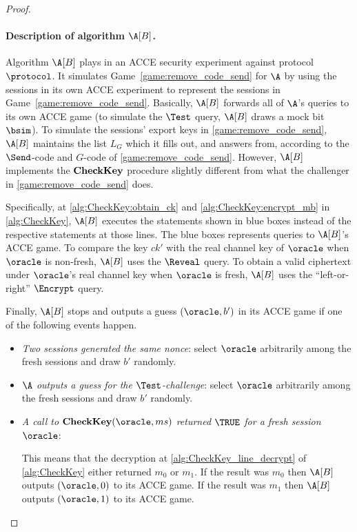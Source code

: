 \begin{proof}
\paragraph{Description of algorithm \texorpdfstring{$\A[B]$}{B}.}
Algorithm $\A[B]$ plays in an ACCE security experiment against protocol $\protocol$.
It simulates Game~\ref{game:remove_code_send} for $\A$ by using the sessions in its own ACCE experiment to represent the sessions in Game~\ref{game:remove_code_send}.
Basically,
$\A[B]$ forwards all of $\A$'s queries to its own ACCE game
(to simulate the $\Test$ query,
$\A[B]$ draws a mock bit $\bsim$).
To simulate the sessions' export keys in \cref{game:remove_code_send},
$\A[B]$ maintains the list $L_G$ which it fills out,
and answers from, 
according to the $\Send$-code and $G$-code of \cref{game:remove_code_send}.
However,
$\A[B]$ implements the $\mathbf{CheckKey}$ procedure slightly different from what the challenger in \cref{game:remove_code_send} does. 

Specifically,
at \cref{alg:CheckKey:obtain_ck} and \cref{alg:CheckKey:encrypt_mb} in \cref{alg:CheckKey},
$\A[B]$ executes the statements shown in blue boxes instead of the respective statements at those lines.
The blue boxes represents queries to $\A[B]$'s ACCE game.
To compare the key $ck'$ with the real channel key of $\oracle$ when $\oracle$ is non-fresh,
$\A[B]$ uses the $\Reveal$ query.
To obtain a valid ciphertext under $\oracle$'s real channel key when $\oracle$ is fresh,
$\A[B]$ uses the ``left-or-right'' $\Encrypt$ query.


Finally,
$\A[B]$ stops and outputs a guess $(\oracle, b')$ in its ACCE game if one of the following events happen.


\begin{itemize}
	\item \emph{Two sessions generated the same nonce}: select $\oracle$ arbitrarily among the fresh sessions and draw $b'$ randomly.
	
	\item \emph{$\A$ outputs a guess for the $\Test$-challenge}:
	select $\oracle$ arbitrarily among the fresh sessions and draw $b'$ randomly.
	
	\item \emph{A call to $\CK(\oracle, ms)$ returned $\TRUE$ for a fresh session $\oracle$}:
	
	This means that the decryption at \cref{alg:CheckKey_line_decrypt} of \cref{alg:CheckKey} either returned $m_0$ or $m_1$.
	If the result was $m_0$ then $\A[B]$ outputs $(\oracle, 0)$ to its ACCE game.
	If the result was $m_1$ then $\A[B]$ outputs $(\oracle, 1)$ to its ACCE game.
	

\end{itemize}
\end{proof}
